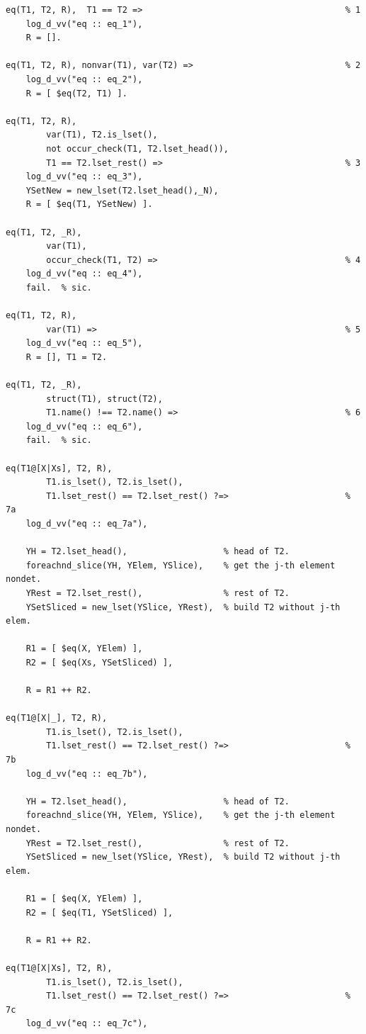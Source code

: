 \documentclass[12pt,a4paper,openright]{book} %
\begin{document}
\begin{verbatim}
eq(T1, T2, R),  T1 == T2 =>                                        % 1
    log_d_vv("eq :: eq_1"),
    R = [].

eq(T1, T2, R), nonvar(T1), var(T2) =>                              % 2
    log_d_vv("eq :: eq_2"),
    R = [ $eq(T2, T1) ].

eq(T1, T2, R), 
        var(T1), T2.is_lset(),
	    not occur_check(T1, T2.lset_head()),
        T1 == T2.lset_rest() =>                                    % 3
    log_d_vv("eq :: eq_3"),
    YSetNew = new_lset(T2.lset_head(),_N),
    R = [ $eq(T1, YSetNew) ].

eq(T1, T2, _R), 
        var(T1),
        occur_check(T1, T2) =>                                     % 4
    log_d_vv("eq :: eq_4"),
    fail.  % sic.

eq(T1, T2, R), 
        var(T1) =>                                                 % 5
    log_d_vv("eq :: eq_5"),
    R = [], T1 = T2.

eq(T1, T2, _R), 
        struct(T1), struct(T2), 
        T1.name() !== T2.name() =>                                 % 6
    log_d_vv("eq :: eq_6"),
    fail.  % sic.

eq(T1@[X|Xs], T2, R), 
        T1.is_lset(), T2.is_lset(),
        T1.lset_rest() == T2.lset_rest() ?=>                       % 7a
    log_d_vv("eq :: eq_7a"),

    YH = T2.lset_head(),                   % head of T2.
    foreachnd_slice(YH, YElem, YSlice),    % get the j-th element nondet.
    YRest = T2.lset_rest(),                % rest of T2.
    YSetSliced = new_lset(YSlice, YRest),  % build T2 without j-th elem.

    R1 = [ $eq(X, YElem) ],
    R2 = [ $eq(Xs, YSetSliced) ],

    R = R1 ++ R2.

eq(T1@[X|_], T2, R), 
        T1.is_lset(), T2.is_lset(),
        T1.lset_rest() == T2.lset_rest() ?=>                       % 7b
    log_d_vv("eq :: eq_7b"),

    YH = T2.lset_head(),                   % head of T2.
    foreachnd_slice(YH, YElem, YSlice),    % get the j-th element nondet.
    YRest = T2.lset_rest(),                % rest of T2.
    YSetSliced = new_lset(YSlice, YRest),  % build T2 without j-th elem.

    R1 = [ $eq(X, YElem) ],
    R2 = [ $eq(T1, YSetSliced) ],

    R = R1 ++ R2.

eq(T1@[X|Xs], T2, R),
        T1.is_lset(), T2.is_lset(),
        T1.lset_rest() == T2.lset_rest() ?=>                       % 7c
    log_d_vv("eq :: eq_7c"),


\end{verbatim}
\end{document}
